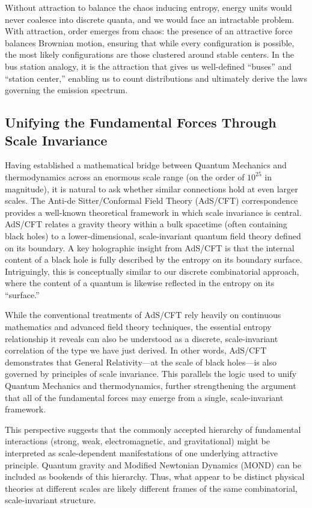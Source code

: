 \documentclass{report}
\begin{document}
Without attraction to balance the chaos inducing entropy, energy units would never coalesce into discrete quanta, and we would face an intractable problem. With attraction, order emerges from chaos: the presence of an attractive force balances Brownian motion, ensuring that while every configuration is possible, the most likely configurations are those clustered around stable centers. In the bus station analogy, it is the attraction that gives us well-defined “buses” and “station center,” enabling us to count distributions and ultimately derive the laws governing the emission spectrum.

\subsection*{Unifying the Fundamental Forces Through Scale Invariance}

Having established a mathematical bridge between Quantum Mechanics and thermodynamics across an enormous scale range (on the order of $10^{25}$ in magnitude), it is natural to ask whether similar connections hold at even larger scales. The Anti-de Sitter/Conformal Field Theory (AdS/CFT) correspondence provides a well-known theoretical framework in which scale invariance is central. AdS/CFT relates a gravity theory within a bulk spacetime (often containing black holes) to a lower-dimensional, scale-invariant quantum field theory defined on its boundary. A key holographic insight from AdS/CFT is that the internal content of a black hole is fully described by the entropy on its boundary surface. Intriguingly, this is conceptually similar to our discrete combinatorial approach, where the content of a quantum is likewise reflected in the entropy on its “surface.”

While the conventional treatments of AdS/CFT rely heavily on continuous mathematics and advanced field theory techniques, the essential entropy relationship it reveals can also be understood as a discrete, scale-invariant correlation of the type we have just derived. In other words, AdS/CFT demonstrates that General Relativity—at the scale of black holes—is also governed by principles of scale invariance. This parallels the logic used to unify Quantum Mechanics and thermodynamics, further strengthening the argument that all of the fundamental forces may emerge from a single, scale-invariant framework.

This perspective suggests that the commonly accepted hierarchy of fundamental interactions (strong, weak, electromagnetic, and gravitational) might be interpreted as scale-dependent manifestations of one underlying attractive principle. Quantum gravity and Modified Newtonian Dynamics (MOND) can be included as bookends of this hierarchy. Thus, what appear to be distinct physical theories at different scales are likely different frames of the same combinatorial, scale-invariant structure.
\end{document}
